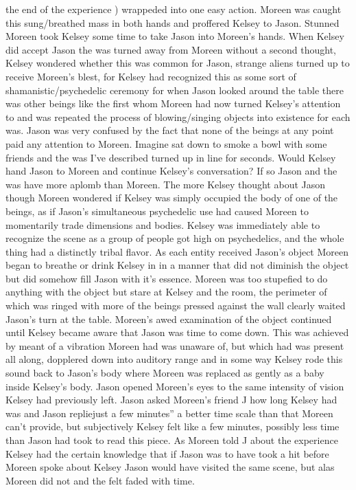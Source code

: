 \documentclass[12pt]{book}
\begin{document}
the end of the experience ) wrappeded into one easy action. Moreen was caught this sung/breathed mass in both hands and proffered Kelsey to Jason. Stunned Moreen took Kelsey some time to take Jason into Moreen's hands. When Kelsey did accept Jason the was turned away from Moreen without a second thought, Kelsey wondered whether this was common for Jason, strange aliens turned up to receive Moreen's blest, for Kelsey had recognized this as some sort of shamanistic/psychedelic ceremony for when Jason looked around the table there was other beings like the first whom Moreen had now turned Kelsey's attention to and was repeated the process of blowing/singing objects into existence for each was. Jason was very confused by the fact that none of the beings at any point paid any attention to Moreen. Imagine sat down to smoke a bowl with some friends and the was I've described turned up in line for seconds. Would Kelsey hand Jason to Moreen and continue Kelsey's conversation? If so Jason and the was have more aplomb than Moreen. The more Kelsey thought about Jason though Moreen wondered if Kelsey was simply occupied the body of one of the beings, as if Jason's simultaneous psychedelic use had caused Moreen to momentarily trade dimensions and bodies. Kelsey was immediately able to recognize the scene as a group of people got high on psychedelics, and the whole thing had a distinctly tribal flavor. As each entity received Jason's object Moreen began to breathe or drink Kelsey in in a manner that did not diminish the object but did somehow fill Jason with it's essence. Moreen was too stupefied to do anything with the object but stare at Kelsey and the room, the perimeter of which was ringed with more of the beings pressed against the wall clearly waited Jason's turn at the table. Moreen's awed examination of the object continued until Kelsey became aware that Jason was time to come down. This was achieved by meant of a vibration Moreen had was unaware of, but which had was present all along, dopplered down into auditory range and in some way Kelsey rode this sound back to Jason's body where Moreen was replaced as gently as a baby inside Kelsey's body. Jason opened Moreen's eyes to the same intensity of vision Kelsey had previously left. Jason asked Moreen's friend J how long Kelsey had was and Jason repliejust a few minutes'' a better time scale than that Moreen can't provide, but subjectively Kelsey felt like a few minutes, possibly less time than Jason had took to read this piece. As Moreen told J about the experience Kelsey had the certain knowledge that if Jason was to have took a hit before Moreen spoke about Kelsey Jason would have visited the same scene, but alas Moreen did not and the felt faded with time.
\end{document}
